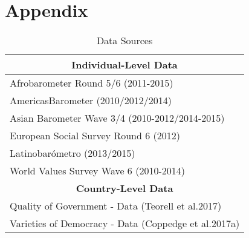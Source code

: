 \newpage
\pagestyle{plain}
\section{Appendix}


\setcounter{table}{0}
\renewcommand{\thetable}{A\arabic{table}}

\setcounter{figure}{0}
\renewcommand{\thefigure}{A\arabic{figure}}

\begin{table}[!h]
	\centering
	\caption{Data Sources}
	\label{data}
	\begin{tabular}{@{}l@{}}
		\toprule
		\multicolumn{1}{c}{\textbf{Individual-Level Data}} \\ \midrule
		Afrobarometer Round 5/6 (2011-2015) \\
		AmericasBarometer (2010/2012/2014) \\
		Asian Barometer Wave 3/4 (2010-2012/2014-2015) \\
		European Social Survey Round 6 (2012) \\
		Latinobarómetro (2013/2015) \\
		World Values Survey Wave 6 (2010-2014) \\ \midrule
		\multicolumn{1}{c}{\textbf{Country-Level Data}} \\ \midrule
		Quality of Government - Data (Teorell et al.2017) \\
		Varieties of Democracy - Data (Coppedge et al.2017a)
	\end{tabular}
\end{table}


